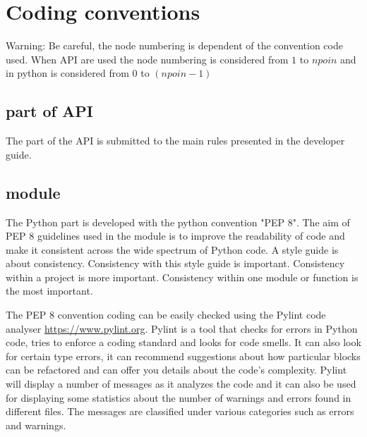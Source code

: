 %
\section{Coding conventions}
%
\begin{WarningBlock}{Warning:}
\centering
Be careful, the node numbering is dependent of the convention code used.
When \fortran API are used the node numbering is considered from
$1$ to $npoin$ and in python is considered from $0$ to $(npoin-1)$
\end{WarningBlock}

\subsection{\fortran part of API}

The \fortran part of the \telemacsystem API is submitted to the main rules
presented in the developer guide.

\subsection{\TelApy{} module}

The Python part is developed with the python convention "PEP 8". The aim of
PEP 8 guidelines used in the \TelApy{} module is to improve the readability of
code and make it consistent across the wide spectrum of Python code. A style
guide is about consistency. Consistency with this style guide is important.
Consistency within a project is more important. Consistency within one module
or function is the most important.

The PEP 8 convention coding can be easily checked using the Pylint code
analyser \url{https://www.pylint.org}. Pylint is a tool that checks for
errors in Python code, tries to enforce a coding standard and looks for code
smells. It can also look for certain type errors, it can recommend suggestions
about how particular blocks can be refactored and can offer you details about
the code’s complexity. Pylint will display a number of messages as it analyzes
the code and it can also be used for displaying some statistics about the
number of warnings and errors found in different files. The messages are
classified under various categories such as errors and warnings.

%
